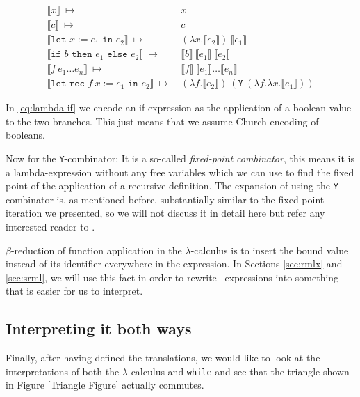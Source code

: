 \documentclass[11pt, leqno, titlepage]{article}
\theoremstyle{definition}
\begin{document}
\begin{align}
  \label{fig:fun-to-lambda}
  \llbracket x \rrbracket~\mapsto~
  & x\\
  \llbracket c\rrbracket~\mapsto~
  & c\\
  \llbracket\texttt{let }x := e_1\texttt{ in }e_2 \rrbracket~\mapsto~
  & (\lambda x.\llbracket e_2\rrbracket)~\llbracket e_1\rrbracket \\
  \llbracket \texttt{if $b$ then $e_1$ else }e_2 \rrbracket~\mapsto~
  & \llbracket b\rrbracket~\llbracket e_1\rrbracket~
    \llbracket e_2\rrbracket \label{eq:lambda-if}\\
 \llbracket f~e_1\dots e_n \rrbracket~\mapsto~
  & \llbracket f\rrbracket~\llbracket e_1\rrbracket \dots \llbracket e_n\rrbracket\\
  \llbracket \texttt{let rec }f~x:= e_1 \texttt{ in } e_2\rrbracket ~\mapsto~
  & (\lambda f.\llbracket e_2\rrbracket)~(\texttt{Y}~
    (\lambda f.\lambda x. \llbracket e_1\rrbracket))
\end{align}

In \ref{eq:lambda-if} we encode an if-expression as the application of a boolean
value to the two branches. This just means that we assume Church-encoding of
booleans.

Now for the \texttt{Y}-combinator: It is a so-called \emph{fixed-point combinator},
this means it is a lambda-expression without any free variables which we can use to
find the fixed point of the application of a recursive definition. The expansion of
using the \texttt{Y}-combinator is, as mentioned before, substantially similar to the
fixed-point iteration we presented, so we will not discuss it in detail here but
refer any interested reader to \cite{y-combinator}. 

$\beta$-reduction of function application in the $\lambda$-calculus is to insert the
bound value instead of its identifier everywhere in the expression. In Sections
\ref{sec:rmlx} and \ref{sec:srml}, we will use this fact in order to rewrite \rml\
expressions into something that is easier for us to interpret. 

\subsection{Interpreting it both ways}\label{sec:lambda-interp} 
Finally, after having defined the translations, we would like to look at the
interpretations of both the $\lambda$-calculus and \texttt{while} and see that the
triangle shown in Figure \todo{Reference triangle figure} [Triangle Figure]
actually commutes.
\end{document}

